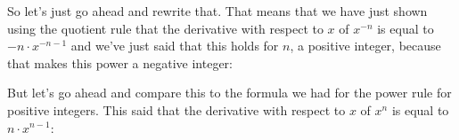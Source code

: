 \documentclass[pdftex, brazil, 12pt, twoside]{article}
\begin{document}
\begin{figure}[H]
  \begin{center}
  \end{center}
\end{figure}

So let's just go ahead and rewrite that.
That means that we have just shown using the quotient rule
that the derivative with respect to $x$ of $x^{-n}$
is equal to $-n \cdot x^{-n -1}$
and we've just said that this holds
for $n$, a positive integer, because that makes
this power a negative integer:

\begin{figure}[H]
  \begin{center}
  \end{center}
\end{figure}

But let's go ahead and compare this
to the formula we had for the power
rule for positive integers.
This said that the derivative with respect to $x$ of $x^n$
is equal to $n \cdot x^{n-1}$:
\end{document}
